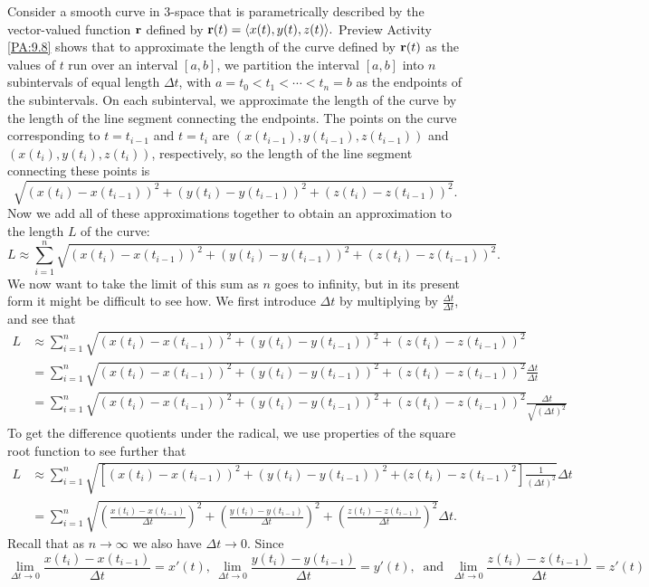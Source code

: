 Consider a smooth curve in 3-space that is parametrically described by
the  vector-valued function $\mathbf{r}$ defined by $\mathbf{r}(t) = \langle x(t), y(t), z(t)
\rangle.$ 
Preview Activity
\ref{PA:9.8} shows that to approximate the
length of the curve defined by $\mathbf{r}(t)$ as the values of $t$ run over
an interval $[a,b]$, we partition the interval $[a,b]$ into $n$
subintervals of equal length $\Delta t$, with $a = t_0 < t_1 < \cdots
< t_n = b$ as the endpoints of the subintervals. On each subinterval,
we approximate the length of the curve by the length of the line
segment connecting the endpoints. The points on the curve
corresponding to $t = t_{i-1}$ and $t = t_i$ are $(x(t_{i-1}),
y(t_{i-1}), z(t_{i-1}))$ and $(x(t_i), y(t_i), z(t_i))$, respectively,
so the length of the line segment connecting these points is
\[\sqrt{(x(t_i) - x(t_{i-1}))^2 + (y(t_i) - y(t_{i-1}))^2 + (z(t_i) -
  z(t_{i-1}))^2}.\]
Now we add all of these approximations together to obtain an
approximation to the length $L$ of the curve:
\[L \approx \sum_{i=1}^n \sqrt{(x(t_i) - x(t_{i-1}))^2 + (y(t_i) -
  y(t_{i-1}))^2 + (z(t_i) - z(t_{i-1}))^2}.\] 
We now want to take the limit of this sum as $n$ goes to infinity, but in its present form it
might be difficult to see how. We first introduce $\Delta t$ by multiplying by $\frac{\Delta t}{\Delta t}$, and see that 
\begin{align*}
L &\approx \sum_{i=1}^n \sqrt{(x(t_i) - x(t_{i-1}))^2 + (y(t_i) - y(t_{i-1}))^2 + (z(t_i) - z(t_{i-1}))^2} \\
    &= \sum_{i=1}^n \sqrt{(x(t_i) - x(t_{i-1}))^2 + (y(t_i) - y(t_{i-1}))^2 + (z(t_i) - z(t_{i-1}))^2} \frac{\Delta t}{\Delta t} \\
    &= \sum_{i=1}^n \sqrt{(x(t_i) - x(t_{i-1}))^2 + (y(t_i) - y(t_{i-1}))^2 + (z(t_i) - z(t_{i-1}))^2} \frac{\Delta t}{\sqrt{(\Delta t)^2}} 
\end{align*}
To get the difference quotients under the radical, we use properties of the square root function to see further that
\begin{align*}
L &\approx \sum_{i=1}^n \sqrt{\left[(x(t_i) - x(t_{i-1}))^2 + (y(t_i) - y(t_{i-1}))^2 + (z(t_i) - z(t_{i-1})^2\right] \frac{1}{(\Delta t)^2}} \Delta t \\
    &= \sum_{i=1}^n \sqrt{\left(\frac{x(t_i) - x(t_{i-1})}{\Delta t}\right)^2 + \left(\frac{y(t_i) - y(t_{i-1})}{\Delta t}\right)^2 + \left(\frac{z(t_i) - z(t_{i-1})}{\Delta t}\right)^2} \Delta t.
\end{align*}
Recall that as $n \to \infty$ we also have $\Delta t \to 0$. Since
\[\lim_{\Delta t \to 0} \frac{x(t_i) - x(t_{i-1})}{\Delta t} = x'(t), \ \lim_{\Delta t \to 0} \frac{y(t_i) - y(t_{i-1})}{\Delta t} = y'(t), \ \text{ and } \ \lim_{\Delta t \to 0} \frac{z(t_i) - z(t_{i-1})}{\Delta t} = z'(t)\]
